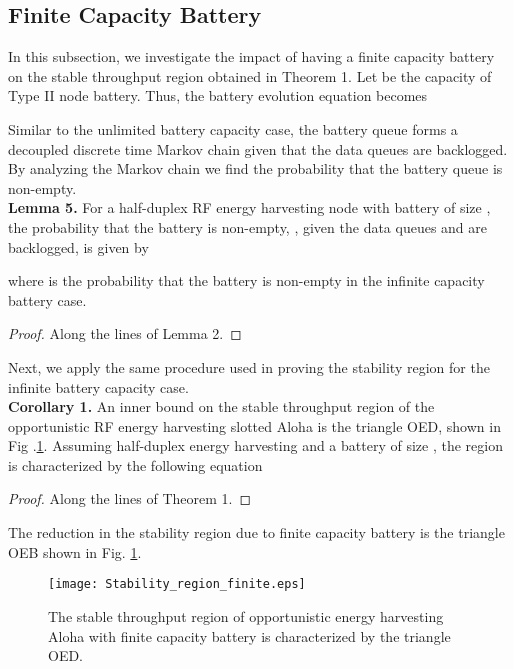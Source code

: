 \documentclass[draftcls,12pt,onecolumn]{IEEEtran}
\begin{document}
\subsection{Finite Capacity Battery}
In this subsection, we investigate the impact of having a finite capacity battery on the stable throughput region obtained in Theorem 1. Let  be the capacity of Type II node battery. Thus, the battery evolution equation becomes 

Similar to the unlimited battery capacity case, the battery queue forms a decoupled discrete time Markov chain given that the data queues are backlogged. By analyzing the Markov chain we find the probability that the battery queue is non-empty.\\
\indent \textbf{Lemma 5.} For a half-duplex RF energy harvesting node with battery of size , the probability that the battery is non-empty, , given the data queues  and  are backlogged, is given by 

where  is the probability that the battery is non-empty in the infinite capacity battery case.
\begin{proof}
Along the lines of Lemma 2.
\end{proof}
\indent Next, we apply the same procedure used in proving the stability region for the infinite battery capacity case. \\
\indent \textbf{Corollary 1.} An inner bound on the stable throughput region of the opportunistic RF energy harvesting slotted Aloha is the triangle OED, shown in Fig .\ref{fig: region finite}. Assuming half-duplex energy harvesting and a battery of size , the region is characterized by the following equation  

\begin{proof}
Along the lines of Theorem 1.
\end{proof}
\indent The reduction in the stability region due to finite capacity battery is the triangle OEB shown in Fig. \ref{fig: region finite}.
\begin{figure}[t]
\texttt{[image: Stability\_region\_finite.eps]}
\centering
\caption{The stable throughput region of opportunistic energy harvesting Aloha with finite capacity battery is characterized by the triangle OED.}\label{fig: region finite}
\end{figure}
\end{document}
